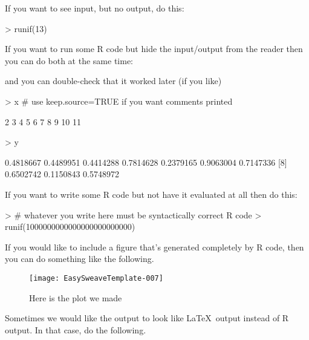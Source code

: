 \documentclass[12pt]{article}         %
\begin{document}
If you want to see input, but no output, do this:

\begin{Schunk}
\begin{Sinput}
> runif(13)
\end{Sinput}
\end{Schunk}

If you want to run some \textsf{R} code but hide the input/output from the reader then you can do both at the same time:


\bigskip   %

and you can double-check that it worked later (if you like)

\begin{Schunk}
\begin{Sinput}
> x  # use keep.source=TRUE if you want comments printed
\end{Sinput}
\begin{Soutput}
 [1]  2  3  4  5  6  7  8  9 10 11
\end{Soutput}
\begin{Sinput}
> y
\end{Sinput}
\begin{Soutput}
 [1] 0.4818667 0.4489951 0.4414288 0.7814628 0.2379165 0.9063004 0.7147336
 [8] 0.6502742 0.1150843 0.5748972
\end{Soutput}
\end{Schunk}

If you want to write some \textsf{R} code but not have it evaluated at all then do this:

\begin{Schunk}
\begin{Sinput}
> # whatever you write here must be syntactically correct R code
> runif(1000000000000000000000000)
\end{Sinput}
\end{Schunk}

If you would like to include a figure that's generated completely by \textsf{R} code, then you can do something like the following.

\begin{figure}
\texttt{[image: EasySweaveTemplate-007]}
\caption{Here is the plot we made}
\end{figure}


Sometimes we would like the output to look like \LaTeX\ output instead of \textsf{R} output.  In that case, do the following.
\end{document}
